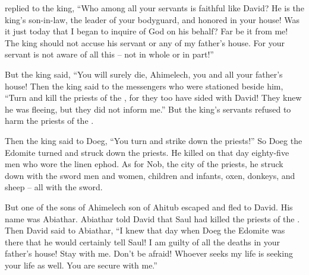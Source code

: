 {replied
to the king,
“Who
among all
your servants
is faithful
like David? He is the king’s
son-in-law,
the leader of your bodyguard,
and honored
in your house!
Was it just today
that I began
to inquire
of God
on his behalf? Far be it
from me! The king
should not
accuse
his servant
or any
of my father’s
house.
For
your servant
is not
aware
of all
this
– not in whole or
in part!”
\par }{\PP {}But the king
said,
“You will surely
die,
Ahimelech,
you
and all
your father’s
house!
Then the king
said
to the messengers
who were stationed
beside him, “Turn
and kill
the priests
of the {}, for
they too
have sided
with
David! They knew
he was fleeing,
but they did not
inform
me.” But the king’s
servants
refused
to harm
the priests
of the {}.
\par }{\PP {}Then the king
said
to Doeg,
“You
turn
and strike
down the priests!” So
Doeg
the Edomite
turned
and struck down
the priests.
He killed
on that day
eighty-five
men
who wore
the linen
ephod.
As for Nob,
the city
of the priests,
he struck down
with the sword
men
and women,
children
and infants,
oxen,
donkeys,
and sheep
– all with the sword.
\par }{\PP {}But one
of the sons
of Ahimelech
son
of Ahitub
escaped
and fled
to David.
His name
was Abiathar.
Abiathar
told
David
that
Saul
had killed
the priests
of the {}.
Then David
said
to Abiathar,
“I knew
that day
when
Doeg
the Edomite
was there
that
he would certainly
tell
Saul! I am
guilty
of all
the deaths
in your father’s
house!
Stay
with
me. Don’t
be afraid! Whoever
seeks
my life
is seeking
your life
as well. You
are secure
with me.”

}
